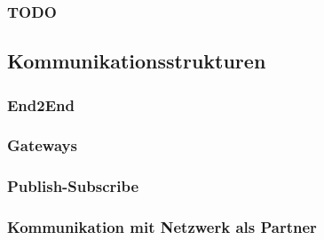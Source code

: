 \subsubsection{TODO}

\subsection{Kommunikationsstrukturen}
\subsubsection{End2End}
\subsubsection{Gateways}
\subsubsection{Publish-Subscribe}
\subsubsection{Kommunikation mit Netzwerk als Partner}